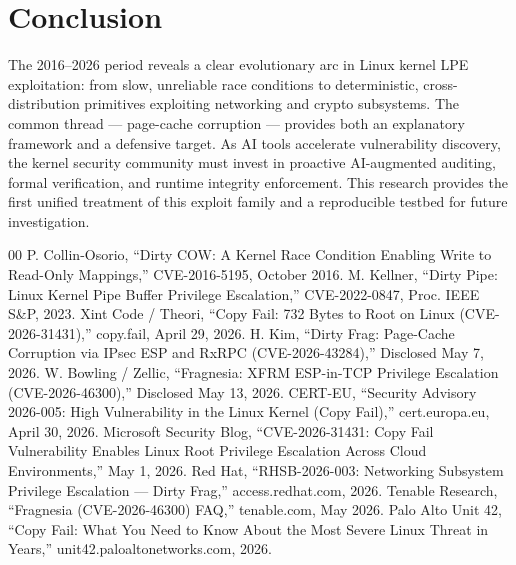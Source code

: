 \documentclass[conference]{IEEEtran}
\begin{document}
\section{Conclusion}
The 2016--2026 period reveals a clear evolutionary arc in Linux kernel LPE exploitation: from slow, unreliable race conditions to deterministic, cross-distribution primitives exploiting networking and crypto subsystems. The common thread --- page-cache corruption --- provides both an explanatory framework and a defensive target. As AI tools accelerate vulnerability discovery, the kernel security community must invest in proactive AI-augmented auditing, formal verification, and runtime integrity enforcement. This research provides the first unified treatment of this exploit family and a reproducible testbed for future investigation.

\begin{thebibliography}{00}
 P. Collin-Osorio, ``Dirty COW: A Kernel Race Condition Enabling Write to Read-Only Mappings,'' CVE-2016-5195, October 2016.
 M. Kellner, ``Dirty Pipe: Linux Kernel Pipe Buffer Privilege Escalation,'' CVE-2022-0847, Proc. IEEE S\&P, 2023.
 Xint Code / Theori, ``Copy Fail: 732 Bytes to Root on Linux (CVE-2026-31431),'' copy.fail, April 29, 2026.
 H. Kim, ``Dirty Frag: Page-Cache Corruption via IPsec ESP and RxRPC (CVE-2026-43284),'' Disclosed May 7, 2026.
 W. Bowling / Zellic, ``Fragnesia: XFRM ESP-in-TCP Privilege Escalation (CVE-2026-46300),'' Disclosed May 13, 2026.
 CERT-EU, ``Security Advisory 2026-005: High Vulnerability in the Linux Kernel (Copy Fail),'' cert.europa.eu, April 30, 2026.
 Microsoft Security Blog, ``CVE-2026-31431: Copy Fail Vulnerability Enables Linux Root Privilege Escalation Across Cloud Environments,'' May 1, 2026.
 Red Hat, ``RHSB-2026-003: Networking Subsystem Privilege Escalation --- Dirty Frag,'' access.redhat.com, 2026.
 Tenable Research, ``Fragnesia (CVE-2026-46300) FAQ,'' tenable.com, May 2026.
 Palo Alto Unit 42, ``Copy Fail: What You Need to Know About the Most Severe Linux Threat in Years,'' unit42.paloaltonetworks.com, 2026.
\end{thebibliography}
\end{document}
